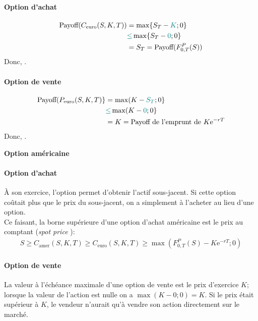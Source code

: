 \documentclass[10pt, french]{article}
\begin{document}
\begin{multicols*}{2}
\paragraph{Option d'achat}
\begin{align*}
	\text{Payoff}(C_{\text{euro}}(S, K, T))
	&=	\max\{S_{T}	-	\textcolor{teal}{K}; 0\}	\\
	&\textcolor{teal}{\leq}	\max\{S_{T}	-	\textcolor{teal}{0}; 0\}	\\
	&=	S_{T}	
	=	\text{Payoff}(F_{0, T}^{P}(S))
\end{align*}
Donc, .


\paragraph{Option de vente}
\begin{align*}
	\text{Payoff}(P_{\text{euro}}(S, K, T)\}
	&=	\max(K	-	\textcolor{teal}{S_{T}}; 0\}	\\
	&\textcolor{teal}{\leq}	\max(K	-	\textcolor{teal}{0}; 0\}	\\
	&=	K
	=	\text{Payoff de l'emprunt de $K\textrm{e}^{-rT}$}
\end{align*}
Donc, .


\begin{center}
	\textbf{Option américaine}
\end{center}

\paragraph{Option d'achat}
À son exercice, l'option permet d'obtenir l'actif sous-jacent. Si cette option coûtait plus que le prix du sous-jacent, on a simplement à l'acheter au lieu d'une option.\\

Ce faisant, \textcolor{cobalt}{la borne supérieure d'une option d'achat américaine est le prix au comptant (\og \textit{spot price} \fg{})}:
\begin{align*}
	S	
	\geq	C_{\text{amer}}(S, K, T)
	\geq	C_{\text{euro}}(S, K, T)
	\geq	\max\left(F_{0, T}^{P}(S) - K\textrm{e}^{-rT}; 0\right)
\end{align*}

\paragraph{Option de vente}
La valeur à l'échéance maximale d'une option de vente est le prix d'exercice $K$; lorsque la valeur de l'action est nulle on a $\max(K - 0; 0) = K$. Si le prix était supérieur à $K$, le vendeur n'aurait qu'à vendre son action directement sur le marché. \\


\end{multicols*}
\end{document}
